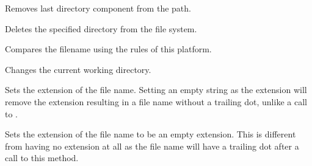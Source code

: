
Removes last directory component from the path.


\label{wxfilenamermdir}



Deletes the specified directory from the file system.


\label{wxfilenamesameas}


Compares the filename using the rules of this platform.


\label{wxfilenamesetcwd}



Changes the current working directory.


\label{wxfilenamesetext}


Sets the extension of the file name. Setting an empty string
as the extension will remove the extension resulting in a file 
name without a trailing dot, unlike a call to 
.



\label{wxfilenamesetemptyext}


Sets the extension of the file name to be an empty extension. 
This is different from having no extension at all as the file 
name will have a trailing dot after a call to this method.



\label{wxfilenamesetfullname}


